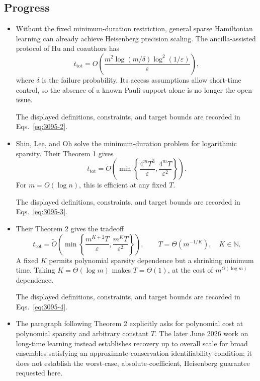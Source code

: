 \subsection*{Progress}

\begin{itemize}
  \item Without the fixed minimum-duration restriction, general sparse Hamiltonian learning can already achieve Heisenberg precision scaling. The ancilla-assisted protocol of Hu and coauthors has
  \begin{equation}
t_{\mathrm{tot}}
  =O\!\left(\frac{m^2\log(m/\delta)\log^2(1/\varepsilon)}{\varepsilon}\right),
\label{eq:3095-2}
\end{equation}
  where $\delta$ is the failure probability. Its access assumptions allow short-time control, so the absence of a known Pauli support alone is no longer the open issue. 

The displayed definitions, constraints, and target bounds are recorded in Eqs.~\eqref{eq:3095-2}.

  \item Shin, Lee, and Oh solve the minimum-duration problem for logarithmic sparsity. Their Theorem 1 gives
  \begin{equation}
t_{\mathrm{tot}}
  =\widetilde O\!\left(
  \min\left\{\frac{4^mT^3}{\varepsilon},
  \frac{4^mT}{\varepsilon^2}\right\}\right).
\label{eq:3095-3}
\end{equation}
  For $m=O(\log n)$, this is efficient at any fixed $T$. 

The displayed definitions, constraints, and target bounds are recorded in Eqs.~\eqref{eq:3095-3}.

  \item Their Theorem 2 gives the tradeoff
  \begin{equation}
t_{\mathrm{tot}}
  =\widetilde O\!\left(
  \min\left\{\frac{m^{K+2}T}{\varepsilon},
  \frac{m^KT}{\varepsilon^2}\right\}\right),
  \qquad T=\Theta(m^{-1/K}),\quad K\in\mathbb N.
\label{eq:3095-4}
\end{equation}
  A fixed $K$ permits polynomial sparsity dependence but a shrinking minimum time. Taking $K=\Theta(\log m)$ makes $T=\Theta(1)$, at the cost of $m^{O(\log m)}$ dependence. 

The displayed definitions, constraints, and target bounds are recorded in Eqs.~\eqref{eq:3095-4}.

  \item The paragraph following Theorem 2 explicitly asks for polynomial cost at polynomial sparsity and arbitrary constant $T$. The later June 2026 work on long-time learning instead establishes recovery up to overall scale for broad ensembles satisfying an approximate-conservation identifiability condition; it does not establish the worst-case, absolute-coefficient, Heisenberg guarantee requested here. 
\end{itemize}

